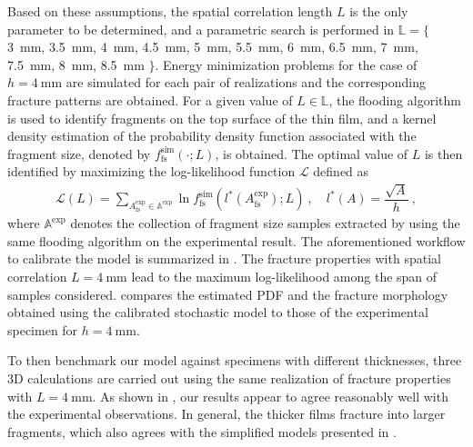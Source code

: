 Based on these assumptions, the spatial correlation length $L$ is the only parameter to be determined, and a parametric search is performed in $\mathbb{L} = \{$ \SI{3}{\milli\meter}, \SI{3.5}{\milli\meter}, \SI{4}{\milli\meter}, \SI{4.5}{\milli\meter}, \SI{5}{\milli\meter}, \SI{5.5}{\milli\meter}, \SI{6}{\milli\meter}, \SI{6.5}{\milli\meter}, \SI{7}{\milli\meter}, \SI{7.5}{\milli\meter}, \SI{8}{\milli\meter}, \SI{8.5}{\milli\meter} $\}$. Energy minimization problems for the case of $h = \SI{4}{\milli\meter}$ are simulated for each pair of realizations and the corresponding fracture patterns are obtained. For a given value of $L \in \mathbb{L}$, the flooding algorithm is used to identify fragments on the top surface of the thin film, and a kernel density estimation of the probability density function associated with the fragment size, denoted by $f_\text{fs}^\text{sim}(\cdot; L)$, is obtained. The optimal value of $L$ is then identified by maximizing the log-likelihood function $\mathcal{L}$ defined as
\begin{align}
  \mathcal{L}(L) = \sum_{A_\text{fs}^\text{exp} \in \mathbb{A}^\text{exp}} \ln{f_\text{fs}^\text{sim}(l^*(A_\text{fs}^\text{exp}); L)}~, \quad l^*(A) = \dfrac{\sqrt{A}}{h}~,
\end{align}
where $\mathbb{A}^\text{exp}$ denotes the collection of fragment size samples extracted by using the same flooding algorithm on the experimental result.
The aforementioned workflow to calibrate the model is summarized in . The fracture properties with spatial correlation $L = \SI{4}{\milli\meter}$ lead to the maximum log-likelihood among the span of samples considered.  compares the estimated PDF and the fracture morphology obtained using the calibrated stochastic model to those of the experimental specimen for $h = \SI{4}{\milli\meter}$.



To then benchmark our model against specimens with different thicknesses, three 3D calculations are carried out using the same realization of fracture properties with $L = \SI{4}{\milli\meter}$. As shown in ,
our results appear to agree reasonably well with the experimental observations. In general, the thicker films fracture into larger fragments, which also agrees with the simplified models presented in .


